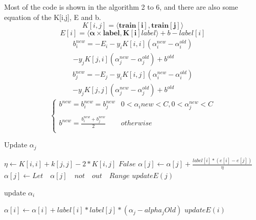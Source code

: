 \documentclass[conference,compsoc]{IEEEtran}
\begin{document}
			Most of the code is shown in the algorithm 2 to 6, and there are also some equation of the K[i,j], E and b.
			\begin{equation}
				K[i,j] = \langle\bm{train[i]},\bm{train[j]}\rangle
			\end{equation}
			\begin{equation}
				E[i] = \langle\bm{\alpha}\times\bm{label}, \bm{K[i]}label\rangle + b - label[i]
			\end{equation}
			\begin{equation}
				\begin{split}
					b_i^{new} = -E_i-y_iK[i,i](\alpha_i^{new}-\alpha_i^{old})\\
					-y_jK[j,i](\alpha_j^{new}-\alpha_j^{old})+b^{old}
				\end{split}
			\end{equation}
			\begin{equation}
				\begin{split}
					b_j^{new} = -E_j-y_iK[i,j](\alpha_i^{new}-\alpha_i^{old})\\
					-y_jK[j,j](\alpha_j^{new}-\alpha_j^{old})+b^{old}
				\end{split}
			\end{equation}
			\begin{equation}
				\left\{
					\begin{array}{lr}
						b^{new}=b_i^{new}=b_j^{new} &0<\alpha_i{new}<C,0<\alpha_j^{new}<C \\
						\\
						b^{new}=\frac{b_i^{new}+b_j^{new}}{2} &otherwise\\
					\end{array}
				\right.
			\end{equation}
			\begin{algorithm}
				\caption{Update $\alpha_j$}
				\begin{algorithmic}[1]
						\State $\eta\gets K[i,i]+k[j,j]-2*K[i,j]$
							\State \Return $False$
						\EndIf
						\State $\alpha[j]\gets \alpha[j]+\frac{label[i]*(e[i]-e[j])}{\eta}$
						\State $\alpha[j]\gets Let \quad \alpha[j] \quad not \quad out \quad Range$
						\State $updateE(j)$
					\EndFunction
				\end{algorithmic}
			\end{algorithm}
			\begin{algorithm}
				\caption{update $\alpha_i$}
				\begin{algorithmic}[1]
					\Function{$update\alpha_i$}{$i,j,\alpha_jOld$}
						\State $\alpha[i]\gets \alpha[i]+label[i]*label[j]*(\alpha_j-alpha_jOld)$
						\State $updateE(i)$
					\EndFunction
				\end{algorithmic}
			\end{algorithm}
\end{document}
